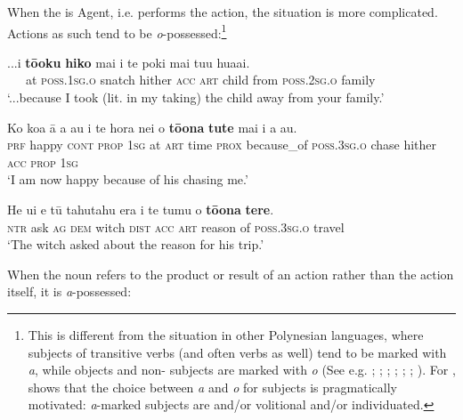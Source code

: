 When the  is Agent, i.e. performs the action, the situation is more complicated. Actions as such tend to be \textit{o}{}-possessed:\footnote{\label{fn:301}This is different from the situation in other Polynesian languages, where subjects of transitive verbs (and often   verbs as well) tend to be marked with \textit{a}, while objects and non- subjects are marked with \textit{o} (See e.g. \citealt{Chung1973}; \citealt[69]{Clark1981}; \citealt[197–201]{LazardPeltzer2000}; \citealt[173–174]{Cablitz2006}; \citealt[540–541]{MoselHovdhaugen1992}; \citealt[503–505]{Besnier2000}; \citealt[140–142]{ElbertPukui1979}). For , \citet{Baker2012} shows that the choice between \textit{a} and \textit{o} for subjects is pragmatically motivated: \textit{a}{}-marked subjects are  and/or volitional and/or individuated.}

\ea\label{ex:6.104}
\gll ...{\ꞌ}i \textbf{tō{\ꞌ}oku} \textbf{hiko} mai i te poki mai tu{\ꞌ}u hua{\ꞌ}ai. \\
~~~at \textsc{poss.1sg.o} snatch hither \textsc{acc} \textsc{art} child from \textsc{poss.2sg.o} family \\

\glt 
‘...because I took (lit. in my taking) the child away from your family.’ \textstyleExampleref{[R229.027]} 
\z

\ea\label{ex:6.105}
\gll Ko koa {\ꞌ}ā a au {\ꞌ}i te hora nei {\ꞌ}o \textbf{tō{\ꞌ}ona} \textbf{tute} mai  i a au.\\
\textsc{prf} happy \textsc{cont} \textsc{prop} \textsc{1sg} at \textsc{art} time \textsc{prox} because\_of \textsc{poss.3sg.o} chase hither  \textsc{acc} \textsc{prop} \textsc{1sg}\\

\glt 
‘I am now happy because of his chasing me.’ \textstyleExampleref{[R214.053]} 
\z

\ea\label{ex:6.106}
\gll He {\ꞌ}ui e tū tahutahu era i te tumu o \textbf{tō{\ꞌ}ona} \textbf{tere}. \\
\textsc{ntr} ask \textsc{ag} \textsc{dem} witch \textsc{dist} \textsc{acc} \textsc{art} reason of \textsc{poss.3sg.o} travel \\

\glt
‘The witch asked about the reason for his trip.’ \textstyleExampleref{[R532-07.043]}
\z

When the noun refers to the product or result of an action rather than the action itself, it is \textit{a}{}-possessed:

